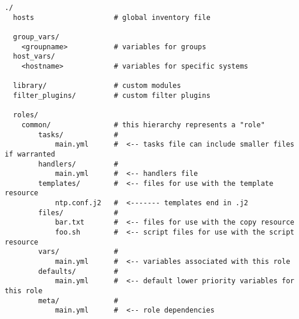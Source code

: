 \begin{verbatim}
./
  hosts                   # global inventory file
  
  group_vars/
    <groupname>           # variables for groups
  host_vars/
    <hostname>            # variables for specific systems
  
  library/                # custom modules
  filter_plugins/         # custom filter plugins
  
  roles/                  
    common/               # this hierarchy represents a "role"
        tasks/            #
            main.yml      #  <-- tasks file can include smaller files if warranted
        handlers/         #
            main.yml      #  <-- handlers file
        templates/        #  <-- files for use with the template resource
            ntp.conf.j2   #  <------- templates end in .j2
        files/            #
            bar.txt       #  <-- files for use with the copy resource
            foo.sh        #  <-- script files for use with the script resource
        vars/             #
            main.yml      #  <-- variables associated with this role
        defaults/         #
            main.yml      #  <-- default lower priority variables for this role
        meta/             #
            main.yml      #  <-- role dependencies

\end{verbatim}
